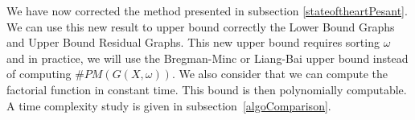 \documentclass[jair,twoside,11pt,theapa]{article}
\begin{document}
We have now corrected the method presented in subsection \ref{stateoftheartPesant}. We can use this new result to upper bound correctly the Lower Bound Graphs and Upper Bound Residual Graphs. This new upper bound requires sorting $\omega$ and in practice, we will use the Bregman-Minc or Liang-Bai upper bound instead of computing $\#PM(G(X, \omega))$. We also consider that we can compute the factorial function in constant time. This bound is then polynomially computable. A time complexity study is given in subsection~\ref{algoComparison}.


\end{document}
